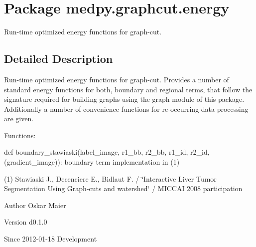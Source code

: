 \hypertarget{namespacemedpy_1_1graphcut_1_1energy}{
\section{Package medpy.graphcut.energy}
\label{namespacemedpy_1_1graphcut_1_1energy}
}


Run-\/time optimized energy functions for graph-\/cut.  




\subsection{Detailed Description}
Run-\/time optimized energy functions for graph-\/cut. Provides a number of standard energy functions for both, boundary and regional terms, that follow the signature required for building graphs using the graph module of this package. Additionally a number of convenience functions for re-\/occurring data processing are given.

Functions:
\begin{DoxyItemize}
\item def boundary\_\-stawiaski(label\_\-image, r1\_\-bb, r2\_\-bb, r1\_\-id, r2\_\-id, (gradient\_\-image)): boundary term implementation in (1)
\end{DoxyItemize}

(1) Stawiaski J., Decenciere E., Bidlaut F. / \char`\"{}Interactive Liver Tumor Segmentation
 Using Graph-\/cuts and watershed\char`\"{} / MICCAI 2008 participation

\begin{DoxyAuthor}{Author}
Oskar Maier 
\end{DoxyAuthor}
\begin{DoxyVersion}{Version}
d0.1.0 
\end{DoxyVersion}
\begin{DoxySince}{Since}
2012-\/01-\/18  Development 
\end{DoxySince}
